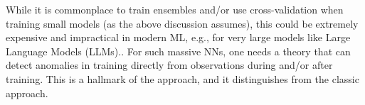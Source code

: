 While it is commonplace to train ensembles and/or use cross-validation when training small models (as the above discussion assumes),
this could be extremely expensive and impractical in modern ML, e.g., for very large models like Large Language Models (LLMs)..
For such massive NNs, one needs a theory that can detect anomalies in training directly from observations during and/or after training.
This is a hallmark of the \SETOL approach, and it distinguishes \SETOL from the classic \STATMECH approach.



